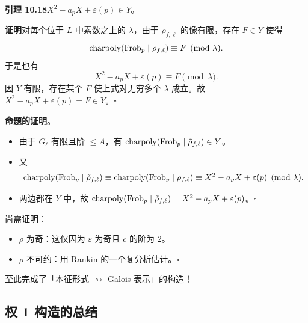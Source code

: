 \noindent\textbf{引理 10.18}\label{lem:10.18}\quad $X^2-a_pX+\varepsilon(p)\in Y$。

\noindent\textbf{证明}\quad 对每个位于 $L$ 中素数之上的 $\lambda$，由于 $\rho_{f,\ell}$ 的像有限，存在 $F\in Y$ 使得
\[
\operatorname{charpoly}(\operatorname{Frob}_p\mid\rho_{f,\ell})\equiv F\pmod\lambda.
\]
于是也有
\[
X^2-a_pX+\varepsilon(p)\equiv F\pmod\lambda.
\]
因 $Y$ 有限，存在某个 $F$ 使上式对无穷多个 $\lambda$ 成立。故 $X^2-a_pX+\varepsilon(p)=F\in Y$。\hfill$\square$

\noindent\textbf{命题的证明}。
\begin{itemize}
\item 由于 $G_\ell$ 有限且阶 $\le A$，有 $\operatorname{charpoly}(\operatorname{Frob}_p\mid\tilde\rho_{f,\ell})\in Y$。
\item 又
\[
\operatorname{charpoly}(\operatorname{Frob}_p\mid\tilde\rho_{f,\ell})\equiv\operatorname{charpoly}(\operatorname{Frob}_p\mid\rho_{f,\ell})\equiv X^2-a_pX+\varepsilon(p)\pmod\lambda.
\]
\item 两边都在 $Y$ 中，故 $\operatorname{charpoly}(\operatorname{Frob}_p\mid\tilde\rho_{f,\ell})=X^2-a_pX+\varepsilon(p)$。\hfill$\square$
\end{itemize}

尚需证明：

\begin{itemize}
\item $\rho$ 为奇：这仅因为 $\varepsilon$ 为奇且 $c$ 的阶为 $2$。
\item $\rho$ 不可约：用 Rankin 的一个复分析估计。\hfill$\square$
\end{itemize}

至此完成了「本征形式 $\rightsquigarrow$ Galois 表示」的构造！
\subsection*{权 1 构造的总结}

\begin{center}
\end{center}

